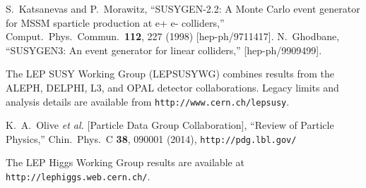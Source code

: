 \documentclass[11pt]{article}
\begin{document}
\begin{thebibliography}{999}



S.~Katsanevas and P.~Morawitz,
  ``SUSYGEN-2.2: A Monte Carlo event generator for MSSM sparticle production
  at e+ e- colliders,''
  Comput.\ Phys.\ Commun.\  {\bf 112}, 227 (1998)
  [hep-ph/9711417].
N.~Ghodbane,
  ``SUSYGEN3: An event generator for linear colliders,''
  [hep-ph/9909499].

 The LEP SUSY Working Group (LEPSUSYWG) combines
results from the ALEPH, DELPHI, L3, and OPAL detector collaborations.
Legacy limits and analysis details
are available from {\tt http://www.cern.ch/lepsusy}.

K.~A.~Olive {\it et al.} [Particle Data Group Collaboration],
  ``Review of Particle Physics,''
  Chin.\ Phys.\ C {\bf 38}, 090001 (2014),
\verb$http://pdg.lbl.gov/$

 The LEP Higgs Working Group results are available
at {\tt http://lephiggs.web.cern.ch/}.


\end{thebibliography}
\end{document}
